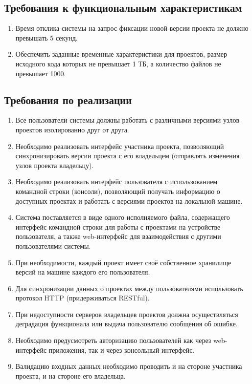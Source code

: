 \documentclass{bmstu}
\begin{document}
  \subsection{Требования к функциональным характеристикам}
  \begin{enumerate}[label*=\arabic*.]
    \item Время отклика системы на запрос фиксации новой версии
      проекта не должно превышать 5 секунд.
    \item Обеспечить заданные временные характеристики для проектов,
      размер исходного кода которых не превышает 1 ТБ, а количество
      файлов не превышает 1000.
  \end{enumerate}

  \subsection{Требования по реализации}

  \begin{enumerate}[label*=\arabic*.]
  \item Все пользователи системы должны работать с различными версиями узлов проектов изолированно друг от друга.
  \item Необходимо реализовать интерфейс участника проекта, позволяющий синхронизировать версии проекта с его владельцем (отправлять изменения
  узлов проекта владельцу).
  \item Необходимо реализовать интерфейс пользователя с использованием командной строки (консоли), позволяющий получать информацию о доступных проектах и работать с версиями проектов на локальной машине.
  \item Система поставляется в виде одного исполняемого файла, содержащего интерфейс командной строки для работы с проектами на устройстве пользователя, а также web-интерфейс для взаимодействия с другими пользователями системы.
  \item При необходимости, каждый проект имеет своё собственное хранилище версий на машине каждого его пользователя.
  \item Для синхронизации данных о проектах между пользователями использовать протокол HTTP (придерживаться RESTful).
  \item При недоступности серверов владельцев проектов должна осуществляться деградация функционала или выдача пользователю сообщения об ошибке.
  \item Необходимо предусмотреть авторизацию пользователей как через web-интерфейс приложения, так и через консольный интерфейс.
  \item Валидацию входных данных необходимо проводить и на стороне участника проекта, и на стороне его владельца.
  \end{enumerate}
\end{document}
